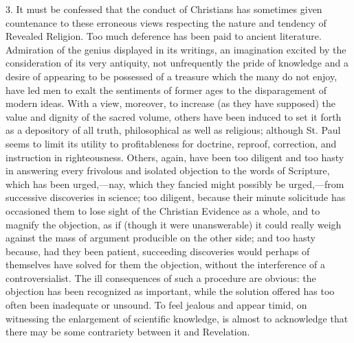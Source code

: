 3. It must be confessed that the conduct of Christians has
sometimes given countenance to these erroneous views respecting the
nature and tendency of Revealed Religion. Too much deference has been
paid to ancient literature. Admiration of the genius displayed in its
writings, an imagination excited by the consideration of its very
antiquity, not unfrequently the pride of knowledge and a desire of
appearing to be possessed of a treasure which the many do not enjoy,
have led men to exalt the sentiments of former ages to the
disparagement of modern ideas. With a view, moreover, to increase (as
they have supposed) the value and dignity of the sacred volume, others
have been induced to set it forth as a depository of all truth,
philosophical as well as religious; although St. Paul seems to limit
its utility to profitableness for doctrine, reproof, correction, and
instruction in righteousness. Others, again, have been too diligent
and too hasty in answering every frivolous and isolated objection to
the words of Scripture, which has been urged,—nay, which they
fancied might possibly be urged,—from successive discoveries in
science; too diligent, because their minute solicitude has occasioned
them to lose sight of the Christian Evidence as a whole, and to
magnify the objection, as if (though it were unanswerable) it could
really weigh against the mass of argument producible on the other
side; and too hasty because, had they been patient, succeeding
discoveries would perhaps of themselves have solved for them the
objection, without the interference of a controversialist. The ill
consequences of such a procedure are obvious: the objection has been
recognized as important, while the solution offered has too often been
inadequate or unsound. To feel jealous and appear timid, on witnessing
the enlargement of scientific knowledge, is almost to acknowledge that
there may be some contrariety between it and Revelation.

